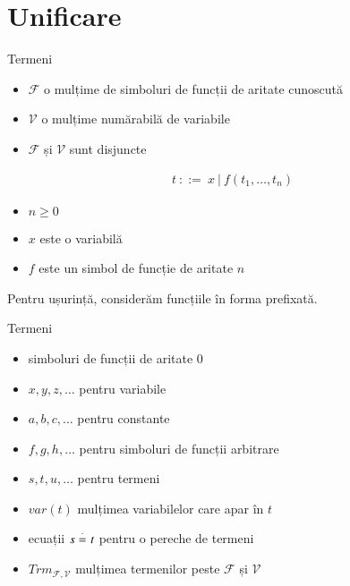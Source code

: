 \documentclass[xcolor=pdftex,romanian,colorlinks]{beamer}
\begin{document}
\section{\color{section-color} Unificare}

\begin{frame}{Termeni}

\vspace{-.2cm}
\begin{itemize}
	\item $\mathcal{F}$ o mulțime de simboluri de funcții de aritate cunoscută
	\item $\mathcal{V}$ o mulțime numărabilă de variabile 
	\item $\mathcal{F}$ și $\mathcal{V}$ sunt disjuncte
\end{itemize}

  \bigskip
{}
\vspace{-.2cm}
\begin{align*}
t \ ::= \ x\ |\ f(t_1,\ldots,t_n)
\end{align*}
\vspace{-1cm}
\begin{itemize}
	\item $n \geq 0$
	\item $x$ este o variabilă
	\item $f$ este un simbol de funcție de aritate $n$ 
\end{itemize}

  \bigskip
Pentru ușurință, considerăm funcțiile în forma prefixată.
\end{frame}

\begin{frame}{Termeni}
\vspace{-.2cm}
\begin{itemize}
	\item {} simboluri de funcții de aritate $0$
	\item $x,y,z,\ldots$ pentru variabile
	\item $a,b,c,\ldots$ pentru constante
	\item $f,g,h,\ldots$ pentru simboluri de funcții arbitrare
	\item $s,t,u,\ldots$ pentru termeni
	\item $var(t)$ mulțimea variabilelor care apar în $t$
	\item ecuații $s \stackrel{\cdot}{=}_{} t$ pentru o pereche de termeni
	\item $Trm_{\mathcal{F,\mathcal{V}}}$ mulțimea termenilor peste $\mathcal{F}$ și $\mathcal{V}$
\end{itemize}

\end{frame}
\end{document}
